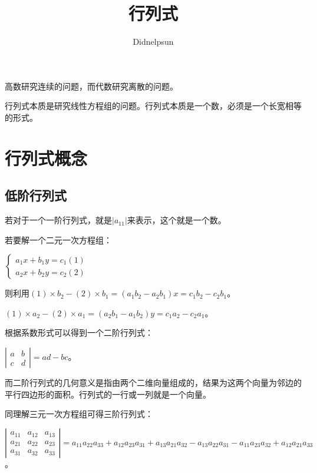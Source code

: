\documentclass[UTF8, 12pt]{ctexart}
\author{Didnelpsun}
\title{行列式}
\date{}
\begin{document}
\maketitle
\pagestyle{empty}
\thispagestyle{empty}
\tableofcontents
\thispagestyle{empty}
\newpage
\pagestyle{plain}
\setcounter{page}{1}

高数研究连续的问题，而代数研究离散的问题。

行列式本质是研究线性方程组的问题。行列式本质是一个数，必须是一个长宽相等的形式。

\section{行列式概念}

\subsection{低阶行列式}

若对于一个一阶行列式，就是$\vert a_11\vert$来表示，这个就是一个数。

若要解一个二元一次方程组：

$\begin{cases}
    a_1x+b_1y=c_1 (1) \\
    a_2x+b_2y=c_2 (2) 
\end{cases}
$

则利用$(1)\times b_2-(2)\times b_1=(a_1b_2-a_2b_1)x=c_1b_2-c_2b_1$。

$(1)\times a_2-(2)\times a_1=(a_2b_1-a_1b_2)y=c_1a_2-c_2a_1$。

根据系数形式可以得到一个二阶行列式：

$
\left|\begin{array}{cc} 
    a & b \\
    c & d
\end{array}\right| 
=ad-bc$。

而二阶行列式的几何意义是指由两个二维向量组成的，结果为这两个向量为邻边的平行四边形的面积。行列式的一行或一列就是一个向量。

同理解三元一次方程组可得三阶行列式：

$
\left|\begin{array}{ccc} 
    a_{11} & a_{12} & a_{13} \\
    a_{21} & a_{22} & a_{23} \\
    a_{31} & a_{32} & a_{33}
\end{array}\right| 
=a_{11}a_{22}a_{33}+a_{12}a_{23}a_{31}+a_{13}a_{21}a_{32}-a_{13}a_{22}a_{31}-a_{11}a_{23}a_{32}+a_{12}a_{21}a_{33}$。
\end{document}
